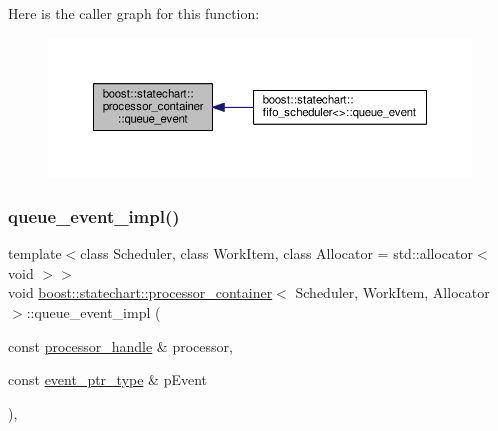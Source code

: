 Here is the caller graph for this function\+:
\nopagebreak
\begin{figure}[H]
\begin{center}
\leavevmode
\includegraphics[width=350pt]{classboost_1_1statechart_1_1processor__container_af734be4c5c3d87830dae2cbb08c9223e_icgraph}
\end{center}
\end{figure}
\mbox{\label{classboost_1_1statechart_1_1processor__container_ad09f73c626dbd09da54efef6e00ca9c5}} 
\subsubsection{\texorpdfstring{queue\+\_\+event\+\_\+impl()}{queue\_event\_impl()}}
{\footnotesize\ttfamily template$<$class Scheduler, class Work\+Item, class Allocator = std\+::allocator$<$ void $>$$>$ \\
void \mbox{\hyperlink{classboost_1_1statechart_1_1processor__container}{boost\+::statechart\+::processor\+\_\+container}}$<$ Scheduler, Work\+Item, Allocator $>$\+::queue\+\_\+event\+\_\+impl (\begin{DoxyParamCaption}\item[{const \mbox{\hyperlink{classboost_1_1statechart_1_1processor__container_a82ebbffaed81d7b99119ae0e892f6411}{processor\+\_\+handle}} \&}]{processor,  }\item[{const \mbox{\hyperlink{classboost_1_1statechart_1_1processor__container_a0123b4f1061816fce5aa2c2ec4c06934}{event\+\_\+ptr\+\_\+type}} \&}]{p\+Event }\end{DoxyParamCaption})\hspace{0.3cm}{\ttfamily [inline]}, {\ttfamily [private]}}

